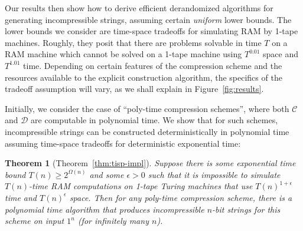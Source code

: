 \documentclass[11pt]{article}
\newtheorem*{theorem*}{Theorem}
\begin{document}
Our results then show how to derive efficient derandomized algorithms for generating incompressible strings, assuming certain \emph{uniform} lower bounds. The lower bounds we consider are time-space tradeoffs for simulating RAM by 1-tape machines. Roughly, they posit that there are problems solvable in time $T$ on a RAM machine which cannot be solved on a 1-tape machine using $T^{0.01}$ space and $T^{1.01}$ time. Depending on certain features of the compression scheme and the resources available to the explicit construction algorithm, the specifics of the tradeoff assumption will vary, as we shall explain in Figure~\ref{fig:results}.

Initially, we consider the case of ``poly-time compression schemes'', where both $\mathcal{C}$ and $\mathcal{D}$ are computable in polynomial time. We show that for such schemes, incompressible strings can be constructed deterministically in polynomial time assuming time-space tradeoffs for deterministic exponential time:
\begin{theorem*}[Theorem~\ref{thm:tisp-impl}]
Suppose there is some exponential time bound $T(n) \geq 2^{\Omega(n)}$ and some $\epsilon > 0$ such that it is impossible to simulate $T(n)$-time RAM computations on 1-tape Turing machines that use $T(n)^{1+\epsilon}$ time and $T(n)^{\epsilon}$ space. Then for any poly-time compression scheme, there is a polynomial time algorithm that produces incompressible $n$-bit strings for this scheme on input $1^n$ (for infinitely many $n$).
\end{theorem*}
\end{document}
